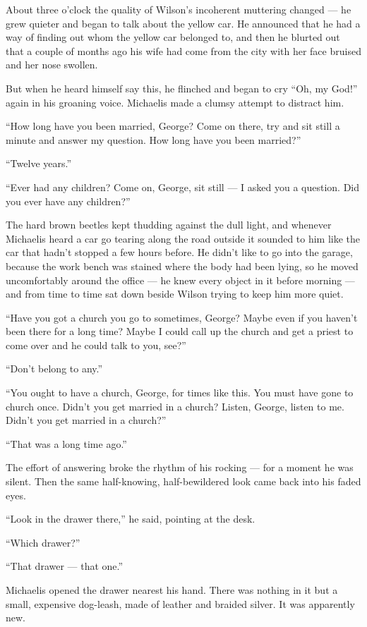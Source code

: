 \documentclass{znotebook}
\begin{document}
About three o’clock the quality of Wilson’s incoherent muttering changed — he grew quieter and began to talk about the yellow car. He announced that he had a way of finding out whom the yellow car belonged to, and then he blurted out that a couple of months ago his wife had come from the city with her face bruised and her nose swollen.

But when he heard himself say this, he flinched and began to cry ``Oh, my God!'' again in his groaning voice. Michaelis made a clumsy attempt to distract him.

``How long have you been married, George? Come on there, try and sit still a minute and answer my question. How long have you been married?''

``Twelve years.''

``Ever had any children? Come on, George, sit still — I asked you a question. Did you ever have any children?''

The hard brown beetles kept thudding against the dull light, and whenever Michaelis heard a car go tearing along the road outside it sounded to him like the car that hadn’t stopped a few hours before. He didn’t like to go into the garage, because the work bench was stained where the body had been lying, so he moved uncomfortably around the office — he knew every object in it before morning — and from time to time sat down beside Wilson trying to keep him more quiet.

``Have you got a church you go to sometimes, George? Maybe even if you haven’t been there for a long time? Maybe I could call up the church and get a priest to come over and he could talk to you, see?''

``Don’t belong to any.''

``You ought to have a church, George, for times like this. You must have gone to church once. Didn’t you get married in a church? Listen, George, listen to me. Didn’t you get married in a church?''

``That was a long time ago.''

The effort of answering broke the rhythm of his rocking — for a moment he was silent. Then the same half-knowing, half-bewildered look came back into his faded eyes.

``Look in the drawer there,'' he said, pointing at the desk.

``Which drawer?''

``That drawer — that one.''

Michaelis opened the drawer nearest his hand. There was nothing in it but a small, expensive dog-leash, made of leather and braided silver. It was apparently new.
\end{document}

